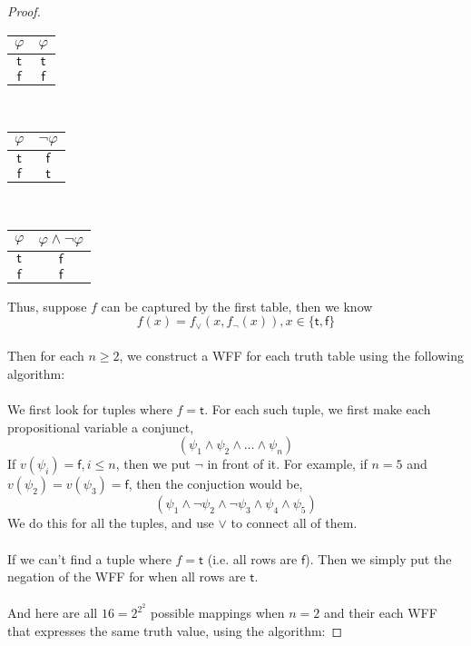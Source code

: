 \documentclass[12pt]{article}
\begin{document}
\begin{proof}
\begin{center}
\begin{tabular}{c|c}
            $\varphi$ & $\varphi$ \\ \hline
            $\mathsf{t}$ & $\mathsf{t}$\\
            $\mathsf{f}$ & $\mathsf{f}$\\
        \end{tabular}
        ~~~
        \begin{tabular}{c|c}
            $\varphi$ & $\neg \varphi$\\ \hline
            $\mathsf{t}$ & $\mathsf{f}$\\
            $\mathsf{f}$ & $\mathsf{t}$\\
        \end{tabular}
        ~~~
        \begin{tabular}{c|c}
            $\varphi$ & $\varphi \land \neg \varphi$\\ \hline
            $\mathsf{t}$ & $\mathsf{f}$\\
            $\mathsf{f}$ & $\mathsf{f}$\\
        \end{tabular}
    \end{center}
    Thus, suppose $f$ can be captured by the first table, then we know 
    $$f(x) = f_{\lor}(x, f_{\neg}(x)), x \in \{\mathsf{t},\mathsf{f}\}$$
    \\
    Then for each $n \geq 2$, we construct a WFF for each truth table using the following algorithm:\\
    \\
    We first look for tuples where $f = \mathsf{t}$.
    For each such tuple, we first make each propositional variable a conjunct,
    $$(\psi_1 \land \psi_2 \land \dots \land \psi_n)$$
    If $v(\psi_i) = \mathsf{f}, i \leq n$, then we put $\neg$ in front of it.
    For example, if $n = 5$ and $v(\psi_2) = v(\psi_3) = \mathsf{f}$, then the conjuction would be,
    $$(\psi_1 \land \neg \psi_2 \land \neg \psi_3 \land \psi_4 \land \psi_5)$$
    We do this for all the tuples, and use $\lor$ to connect all of them.\\
    \\
    If we can't find a tuple where $f = \mathsf{t}$ (i.e. all rows are $\mathsf{f}$).
    Then we simply put the negation of the WFF for when all rows are $\mathsf{t}$.\\
    \\
    And here are all $16 = 2^{2^2}$ possible mappings when $n = 2$ and their each WFF that expresses the same truth value, using the algorithm:


\end{proof}
\end{document}

